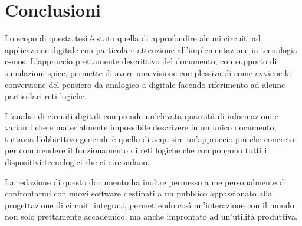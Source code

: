 \chapter{Conclusioni}
	
	Lo scopo di questa tesi è stato quella di approfondire alcuni circuiti ad applicazione digitale con particolare attenzione all'implementazione in tecnologia c-mos. L'approccio prettamente descrittivo del documento, con supporto di simulazioni spice, permette di avere una visione complessiva di come avviene la conversione del pensiero da analogico a digitale facendo riferimento ad alcune particolari reti logiche.
	
	L'analisi di circuiti digitali comprende un'elevata quantità di informazioni e varianti che è materialmente impossibile descrivere in un unico documento, tuttavia l'obbiettivo generale è quello di acquisire un'approccio più che concreto per comprendere il funzionamento di reti logiche che compongono tutti i dispositivi tecnologici che ci circondano.
	
	La redazione di questo documento ha inoltre permesso a me personalmente di confrontarmi con nuovi software destinati a un pubblico appassionato alla progettazione di circuiti integrati, permettendo così un'interazione con il mondo non solo prettamente accademico, ma anche improntato ad un'utilità produttiva.